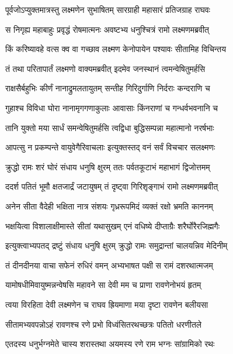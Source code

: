 
\twolineshloka
{पूर्वजोऽप्युक्तमात्रस्तु लक्ष्मणेन सुभाषितम्}
{सारग्राही महासारं प्रतिजग्राह राघवः} %

\twolineshloka
{स निगृह्य महाबाहुः प्रवृद्धं रोषमात्मनः}
{अवष्टभ्य धनुश्चित्रं रामो लक्ष्मणमब्रवीत्} %

\twolineshloka
{किं करिष्यावहे वत्स क्व वा गच्छाव लक्ष्मण}
{केनोपायेन पश्यावः सीतामिह विचिन्तय} %

\twolineshloka
{तं तथा परितापार्तं लक्ष्मणो वाक्यमब्रवीत्}
{इदमेव जनस्थानं त्वमन्वेषितुमर्हसि} %

\twolineshloka
{राक्षसैर्बहुभिः कीर्णं नानाद्रुमलतायुतम्}
{सन्तीह गिरिदुर्गाणि निर्दराः कन्दराणि च} %

\twolineshloka
{गुहाश्च विविधा घोरा नानामृगगणाकुलाः}
{आवासाः किंनराणां च गन्धर्वभवनानि च} %

\twolineshloka
{तानि युक्तो मया सार्धं समन्वेषितुमर्हसि}
{त्वद्विधा बुद्धिसम्पन्ना महात्मानो नरर्षभाः} %

\twolineshloka
{आपत्सु न प्रकम्पन्ते वायुवेगैरिवाचलाः}
{इत्युक्तस्तद् वनं सर्वं विचचार सलक्ष्मणः} %

\twolineshloka
{क्रुद्धो रामः शरं घोरं संधाय धनुषि क्षुरम्}
{ततः पर्वतकूटाभं महाभागं द्विजोत्तमम्} %

\twolineshloka
{ददर्श पतितं भूमौ क्षतजार्द्रं जटायुषम्}
{तं दृष्ट्वा गिरिशृङ्गाभं रामो लक्ष्मणमब्रवीत्} %

\twolineshloka
{अनेन सीता वैदेही भक्षिता नात्र संशयः}
{गृध्ररूपमिदं व्यक्तं रक्षो भ्रमति काननम्} %

\twolineshloka
{भक्षयित्वा विशालाक्षीमास्ते सीतां यथासुखम्}
{एनं वधिष्ये दीप्ताग्रैः शरैर्घोरैरजिह्मगैः} %

\twolineshloka
{इत्युक्त्वाभ्यपतद् द्रष्टुं संधाय धनुषि क्षुरम्}
{क्रुद्धो रामः समुद्रान्तां चालयन्निव मेदिनीम्} %

\twolineshloka
{तं दीनदीनया वाचा सफेनं रुधिरं वमन्}
{अभ्यभाषत पक्षी स रामं दशरथात्मजम्} %

\twolineshloka
{यामोषधीमिवायुष्मन्नन्वेषसि महावने}
{सा देवी मम च प्राणा रावणेनोभयं हृतम्} %

\twolineshloka
{त्वया विरहिता देवी लक्ष्मणेन च राघव}
{ह्रियमाणा मया दृष्टा रावणेन बलीयसा} %

\twolineshloka
{सीतामभ्यवपन्नोऽहं रावणश्च रणे प्रभो}
{विध्वंसितरथच्छत्रः पतितो धरणीतले} %

\twolineshloka
{एतदस्य धनुर्भग्नमेते चास्य शरास्तथा}
{अयमस्य रणे राम भग्नः सांग्रामिको रथः} %

